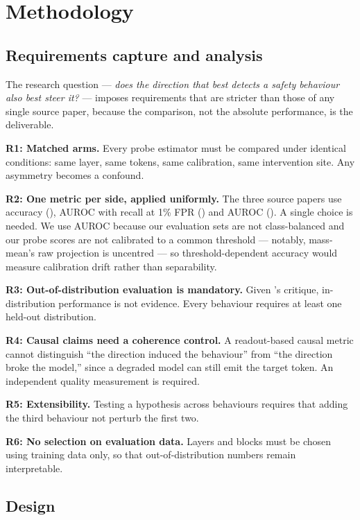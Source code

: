 \documentclass[conference]{IEEEtran}
\begin{document}
\section{Methodology}

\subsection{Requirements capture and analysis}

The research question --- \emph{does the direction that best detects a safety
behaviour also best steer it?} --- imposes requirements that are stricter than
those of any single source paper, because the comparison, not the absolute
performance, is the deliverable.

\textbf{R1: Matched arms.} Every probe estimator must be compared under
identical conditions: same layer, same tokens, same calibration, same
intervention site. Any asymmetry becomes a confound.

\textbf{R2: One metric per side, applied uniformly.} The three source papers use
accuracy (\citeauthor{marks2024}), AUROC with recall at 1\% FPR
(\citeauthor{goldowsky2025}) and AUROC (\citeauthor{mckenzie2025}). A single
choice is needed. We use AUROC because our evaluation sets are not
class-balanced and our probe scores are not calibrated to a common threshold ---
notably, mass-mean's raw projection is uncentred --- so threshold-dependent
accuracy would measure calibration drift rather than separability.

\textbf{R3: Out-of-distribution evaluation is mandatory.} Given
\citeauthor{levinstein2024}'s critique, in-distribution performance is not
evidence. Every behaviour requires at least one held-out distribution.

\textbf{R4: Causal claims need a coherence control.} A readout-based causal
metric cannot distinguish ``the direction induced the behaviour'' from ``the
direction broke the model,'' since a degraded model can still emit the target
token. An independent quality measurement is required.

\textbf{R5: Extensibility.} Testing a hypothesis across behaviours requires that
adding the third behaviour not perturb the first two.

\textbf{R6: No selection on evaluation data.} Layers and blocks must be chosen
using training data only, so that out-of-distribution numbers remain
interpretable.

\subsection{Design}
\end{document}
